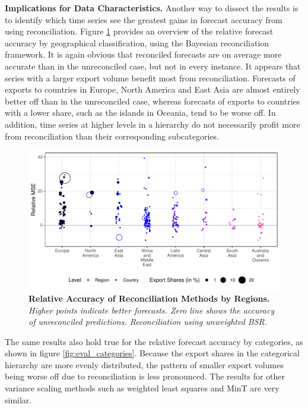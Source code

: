 \documentclass[a4paper,fleqn,11pt]{article}
\begin{document}
\noindent\textbf{Implications for Data Characteristics.} Another way to dissect the results is to identify which time series see the greatest gains in forecast accuracy from using reconciliation. Figure \ref{fig:eval_regions} provides an overview of the relative forecast accuracy by geographical classification, using the Bayesian reconciliation framework. It is again obvious that reconciled forecasts are on average more accurate than in the unreconciled case, but not in every instance. It appears that series with a larger export volume benefit most from reconciliation. Forecasts of exports to countries in Europe, North America and East Asia are almost entirely better off than in the unreconciled case, whereas forecasts of exports to countries with a lower share, such as the islands in Oceania, tend to be worse off. In addition, time series at higher levels in a hierarchy do not necessarily profit more from reconciliation than their corresponding subcategories.
 \begin{figure}[H]
	\includegraphics[width=\textwidth]{fig/fig_eval_regions}
	\caption[Relative Accuracy of Reconciliation Methods by Regions]{\textbf{Relative Accuracy of Reconciliation Methods by Regions.} \small{\textit{Higher points indicate better forecasts. Zero line shows the accuracy of unreconciled predictions. Reconciliation using unweighted BSR.}}}\label{fig:eval_regions}
\end{figure}
The same results also hold true for the relative forecast accuracy by categories, as shown in figure \ref{fig:eval_categories}. Because the export shares in the categorical hierarchy are more evenly distributed, the pattern of smaller export volumes being worse off due to reconciliation is less pronounced. The results for other variance scaling methods such as weighted least squares and MinT are very similar.
\end{document}
